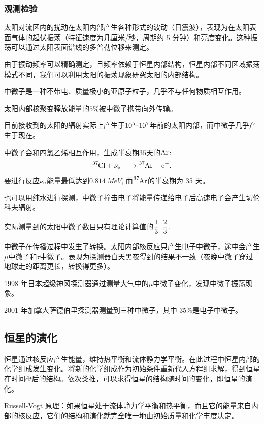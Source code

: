 \documentclass[../天体物理基础.tex]{subfiles}
\begin{document}
\subsubsection{观测检验}
太阳对流区内的扰动在太阳内部产生各种形式的波动（日震波），表现为在太阳表面气体的起伏振荡（特征速度为几厘米/秒，周期约 5 分钟）和亮度变化。这种振荡可以通过太阳表面谱线的多普勒位移来测定。

由于振动频率可以精确测定，且频率依赖于恒星内部结构，恒星内部不同区域振荡模式不同，我们可以利用太阳的振荡现象研究太阳的内部结构。

中微子是一种不带电、质量极小的亚原子粒子，几乎不与任何物质相互作用。

太阳内部核聚变释放能量的$5\%$被中微子携带向外传输。

目前接收到的太阳的辐射实际上产生于$10^{5}\text{\textendash}10^{7}$年前的太阳内部，而中微子几乎产生于现在。

中微子会和四氯乙烯相互作用，生成半衰期$35$天的$\ce{Ar}$:
\begin{equation}
\ce{^{37}Cl}+\nu_{\ce{e}}\ce{->^{37}Ar +e-}.\\
\end{equation}
要进行反应$\nu_{\ce{e}}$能量最低达到$\qty{0.814}{MeV}$, 而$\ce{^{37}Ar}$的半衰期为 35 天。

也可以用纯水进行探测，中微子撞击电子将能量传递给电子后高速电子会产生切伦科夫辐射。

实际测量到的太阳中微子数目只有理论计算值的$\dfrac{1}{3}\text{\textendash}\dfrac{2}{3}$.

中微子在传播过程中发生了转换。太阳内部核反应只产生电子中微子，途中会产生$\mu$中微子和$\tau$中微子。表现为探测器白天黑夜得到的结果不一致（夜晚中微子穿过地球走的距离更长，转换得更多）。

1998 年日本超级神冈探测器通过测量大气中的$\mu$中微子变化，发现中微子振荡现象。

2001 年加拿大萨德伯里探测器测量到三种中微子，其中 35\%是电子中微子。

\subsection{恒星的演化}
恒星通过核反应产生能量，维持热平衡和流体静力学平衡。在此过程中恒星内部的化学组成发生变化。将新的化学组成作为初始条件重新代入方程组求解，得到恒星在时间$\mathrm{d}t$后的结构。依次类推，可以求得恒星的结构随时间的变化，即恒星的演化。

Russell-Vogt 原理：如果恒星处于流体静力学平衡和热平衡，而且它的能量来自内部的核反应，它们的结构和演化就完全唯一地由初始质量和化学丰度决定。
\end{document}
